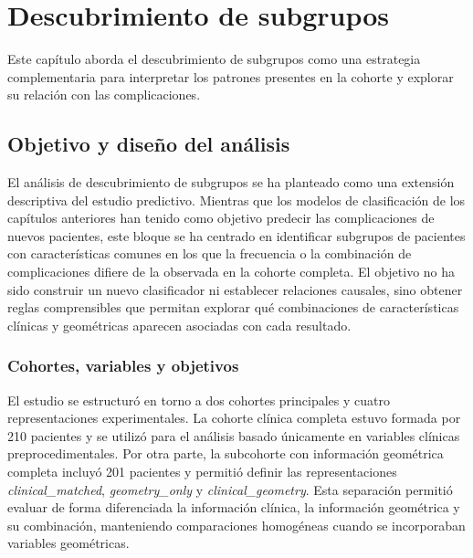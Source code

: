 \chapter{Descubrimiento de subgrupos}\label{chap:subgroup_discovery}

Este capítulo aborda el descubrimiento de subgrupos como una estrategia complementaria para interpretar los patrones presentes en la cohorte y explorar su relación con las complicaciones.

\section{Objetivo y diseño del análisis}
El análisis de descubrimiento de subgrupos se ha planteado como una extensión descriptiva del estudio predictivo. Mientras que los modelos de clasificación de los capítulos anteriores han tenido como objetivo predecir las complicaciones de nuevos pacientes, este bloque se ha centrado en identificar subgrupos de pacientes con características comunes en los que la frecuencia o la combinación de complicaciones difiere de la observada en la cohorte completa. El objetivo no ha sido construir un nuevo clasificador ni establecer relaciones causales, sino obtener reglas comprensibles que permitan explorar qué combinaciones de características clínicas y geométricas aparecen asociadas con cada resultado.

\subsection{Cohortes, variables y objetivos}

El estudio se estructuró en torno a dos cohortes principales y cuatro representaciones experimentales. La cohorte clínica completa estuvo formada por 210 pacientes y se utilizó para el análisis basado únicamente en variables clínicas preprocedimentales. Por otra parte, la subcohorte con información geométrica completa incluyó 201 pacientes y permitió definir las representaciones \textit{clinical\_matched}, \textit{geometry\_only} y \textit{clinical\_geometry}. Esta separación permitió evaluar de forma diferenciada la información clínica, la información geométrica y su combinación, manteniendo comparaciones homogéneas cuando se incorporaban variables geométricas.

